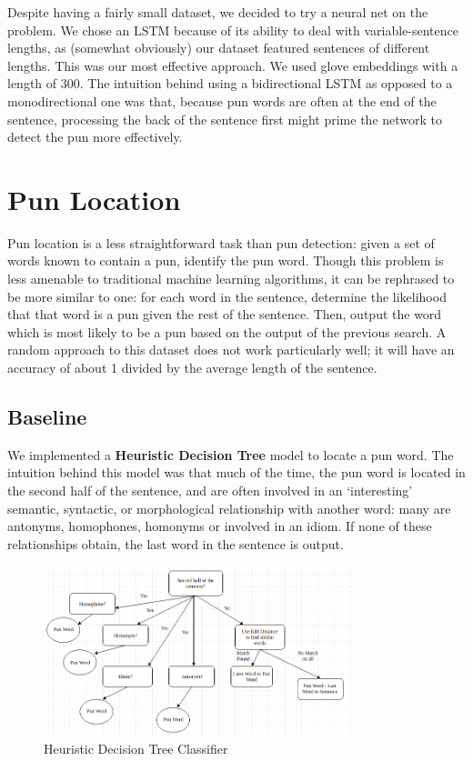 \documentclass{article}
\begin{document}
Despite having a fairly small dataset, we decided to try a neural net on the
problem. We chose an LSTM because of its ability to deal with variable-sentence
lengths, as (somewhat obviously) our dataset featured sentences of different
lengths. This was our most effective approach. We used glove embeddings with a
length of 300. The intuition behind using a bidirectional LSTM as opposed to a
monodirectional one was that, because pun words are often at the end of the
sentence, processing the back of the sentence first might prime the network to
detect the pun more effectively.

\section{Pun Location}
\label{pun_location}

Pun location is a less straightforward task than pun detection: given a set of
words known to contain a pun, identify the pun word. Though this problem is less
amenable to traditional machine learning algorithms, it can be rephrased to be
more similar to one: for each word in the sentence, determine the likelihood
that that word is a pun given the rest of the sentence. Then, output the word
which is most likely to be a pun based on the output of the previous search.  A
random approach to this dataset does not work particularly well; it will have an
accuracy of about 1 divided by the average length of the sentence.
 
\subsection{Baseline}

We implemented a \textbf{Heuristic Decision Tree} model to locate a pun word.
The intuition behind this model was that much of the time, the pun word is
located in the second half of the sentence, and are often involved in an
`interesting' semantic, syntactic, or morphological relationship with another
word: many are antonyms, homophones, homonyms or involved in an idiom. If none
of these relationships obtain, the last word in the sentence is output.

\begin{figure}[h!]
\centering
\includegraphics[width=90mm]{figures/decision_tree.png}
\caption{Heuristic Decision Tree Classifier}
\label{fig:method}
\end{figure}
\end{document}

